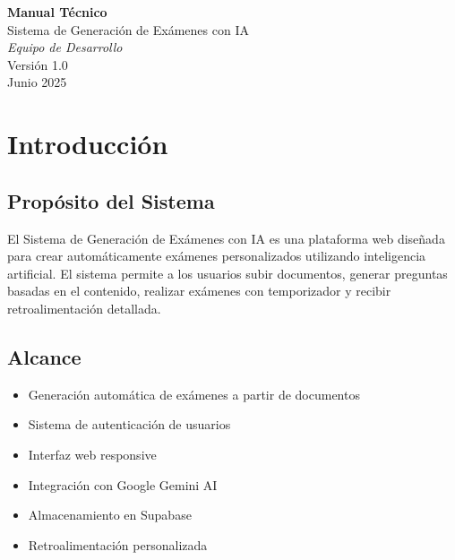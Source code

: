 \documentclass[12pt,a4paper]{report}
\begin{document}
\begin{titlepage}
    \centering
    \vspace*{2cm}
    
    {\Huge\bfseries Manual Técnico}\\[0.5cm]
    {\Large Sistema de Generación de Exámenes con IA}\\[2cm]
    
    
    {\large\itshape Equipo de Desarrollo}\\[3cm]
    
    {\large Versión 1.0}\\[0.5cm]
    {\large Junio 2025}
    
    \vfill
\end{titlepage}

\tableofcontents
\newpage

\listoffigures
\newpage

\listoftables
\newpage

\chapter{Introducción}

\section{Propósito del Sistema}
El Sistema de Generación de Exámenes con IA es una plataforma web diseñada para crear automáticamente exámenes personalizados utilizando inteligencia artificial. El sistema permite a los usuarios subir documentos, generar preguntas basadas en el contenido, realizar exámenes con temporizador y recibir retroalimentación detallada.

\section{Alcance}
\begin{itemize}
    \item Generación automática de exámenes a partir de documentos
    \item Sistema de autenticación de usuarios
    \item Interfaz web responsive
    \item Integración con Google Gemini AI
    \item Almacenamiento en Supabase
    \item Retroalimentación personalizada
\end{itemize}
\end{document}
